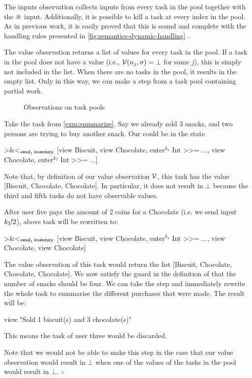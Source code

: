 The inputs observation collects inputs from every task in the pool
together with the $\circledast$ input.
Additionally, it is possible to kill a task at every index in the pool.
As in previous work, it is easily proved that this is sound and complete with the handling rules presented in \cref{fig:semantics-dynamic-handling} \cite{Steenvoorden22}.

The value observation returns a list of values for every task in the pool.
If a task in the pool does not have a value (i.e., $\mathcal{V}(n_j,\sigma) = \bot$ for some $j$),
this is simply not included in the list.
When there are no tasks in the pool, it results in the empty list.
Only in this way,
we can make a step from a task pool containing partial work.

\begin{figure}
  \ODynamic
  \caption{Observations on task pools}
  \label{fig:observations-dynamic}
\end{figure}

\begin{example}
  \label{exm:partial-work}
  Take the  task from \cref{exm:summarize}.
  Say we already sold 3 snacks, and two persons are trying to buy another snack.
  Our  could be in the state
  \begin{TASK}
    >&<$_{\textsf{vend}_1\,\textsf{\textit{inventory}}}$ [view Biscuit, view Chocolate,
      enter$^{k_3}$ Int >>= ..., view Chocolate, enter$^{k_5}$ Int >>= ...]
  \end{TASK}
  Note that, by definition of our value observation $\mathcal{V}$,
  this task has the value [Biscuit, Chocolate, Chocolate].
  In particular, it does not result in $\bot$ because the third and fifth tasks do not have observable values.

  After user five pays the amount of 2 coins for a Chocolate (i.e. we send input $k_3!2$),
  above task will be rewritten to:
  \begin{TASK}
    >&<$_{\textsf{vend}_1\,\textsf{\textit{inventory}}}$ [view Biscuit, view Chocolate,
      enter$^{k_3}$ Int >>= ..., view Chocolate, view Chocolate]
  \end{TASK}
  The value observation of this task would return the list [Biscuit, Chocolate, Chocolate, Chocolate].
  We now satisfy the guard in the definition of  that the number of snacks should be four.
  We can take the step and immediately rewrite the whole task to summarise the different purchases that were made.
  The result will be:
  \begin{TASK}
    view "Sold 1 biscuit(s) and 3 chocolate(s)"
  \end{TASK}
  This means the  task of user three would be discarded.

  Note that we would not be able to make this step in the case that our value observation would result in $\bot$ when one of the values of the tasks in the pool would result in $\bot$.
\hfill$\therefore$\end{example}